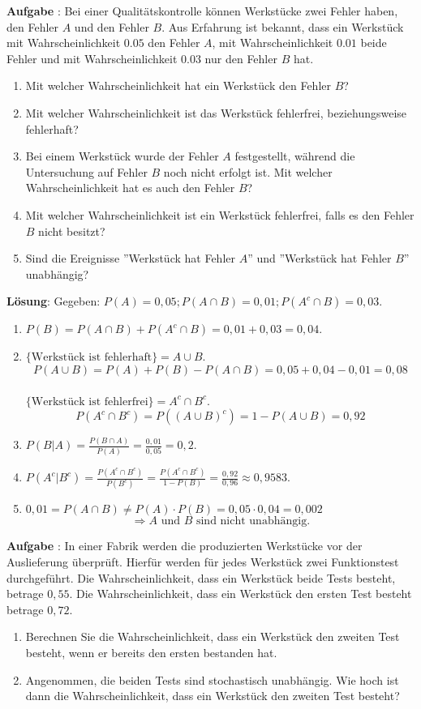 \documentclass[a4paper,13pt]{scrartcl}
\newcommand{\exercise}{\vspace*{0.2cm}
\stepcounter{aufgabe}
\noindent
\textbf{Aufgabe \arabic{aufgabe}}: }
\newcounter{aufgabe}
\newcommand{\solution}{\vspace*{0.2cm}
\noindent
\textbf{Lösung}: }
\begin{document}
\exercise
Bei einer Qualitätskontrolle können Werkstücke zwei Fehler haben, den Fehler $A$ und den Fehler $B$. Aus Erfahrung ist bekannt, dass ein Werkstück mit Wahrscheinlichkeit $0.05$  den Fehler $A$, mit Wahrscheinlichkeit $0.01$ beide Fehler und mit  Wahrscheinlichkeit $0.03$ nur den Fehler $B$ hat.
\begin{enumerate}[label=(\alph*)]
\item Mit welcher Wahrscheinlichkeit hat ein Werkstück den Fehler $B$?
\item Mit welcher Wahrscheinlichkeit ist das Werkstück fehlerfrei, beziehungsweise fehlerhaft?
\item Bei einem Werkstück wurde der Fehler $A$ festgestellt, während die Untersuchung auf Fehler $B$ noch nicht erfolgt ist. Mit welcher Wahrscheinlichkeit hat es auch den Fehler $B$?
\item Mit welcher Wahrscheinlichkeit ist ein Werkstück fehlerfrei, falls es den Fehler $B$ nicht besitzt?
\item Sind die Ereignisse ''Werkstück hat Fehler $A$''  und ''Werkstück hat Fehler $B$'' unabhängig?
\end{enumerate}
\vspace{8mm}

\solution
Gegeben: $P(A) = 0,05; P(A \cap B) = 0,01; P(A^c \cap B) = 0,03$.
\begin{enumerate}[label=(\alph*)]
\item $P(B) = P(A \cap B) + P(A^c \cap B) = 0,01 + 0,03 = 0,04$.
\item $ \{ \text{Werkstück ist fehlerhaft} \} = A \cup B$.  $$P(A \cup B) = P(A) + P(B) - P(A \cap B)= 0,05 + 0,04 -0,01 = 0,08$$
\\ $ \{ \text{Werkstück ist fehlerfrei} \} = A^c \cap B^c$.  $$P(A^c \cap B^c) = P((A \cup B)^c) = 1 - P(A \cup B)= 0,92$$
\item $P(B | A) = \frac{P(B \cap A)}{P(A)} = \frac{0,01}{0,05} = 0,2$.
\item $P(A^c | B^c) = \frac{P(A^c \cap B^c)}{P(B^c)} = \frac{P(A^c \cap B^c)}{1 - P(B)} = \frac{0,92}{0,96} \approx 0,9583$.
\item $0,01 = P(A \cap B) \neq P(A) \cdot P(B) = 0,05 \cdot 0,04 = 0,002$ $$ \Rightarrow A \text{ und } B \text{ sind nicht unabhängig.}$$
\end{enumerate}
\vspace{8mm}


\exercise
In einer Fabrik werden die produzierten Werkstücke vor der Auslieferung überprüft. Hierfür werden für jedes Werkstück   zwei Funktionstest durchgeführt.  Die Wahrscheinlichkeit, dass ein Werkstück beide Tests besteht, betrage $0,55$. Die Wahrscheinlichkeit, dass ein Werkstück  den ersten Test besteht betrage $0,72$. 
\begin{enumerate}[label=(\alph*)]
\item Berechnen Sie die Wahrscheinlichkeit, dass ein Werkstück den zweiten Test besteht, wenn er bereits den ersten bestanden hat.
\item Angenommen, die beiden Tests sind stochastisch unabhängig. Wie hoch ist dann die Wahrscheinlichkeit, dass ein Werkstück den zweiten Test besteht?
\end{enumerate}
\vspace{8mm}
\end{document}
